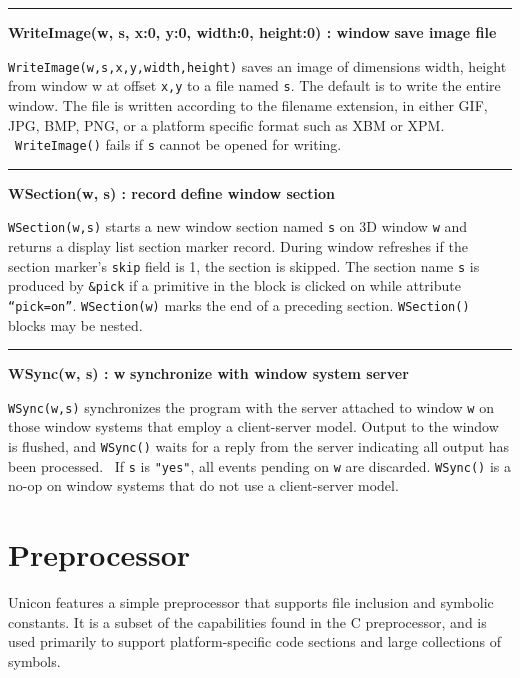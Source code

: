 \bigskip\hrule\vspace{0.1cm}
\noindent
{\bf WriteImage(w, s, x:0, y:0, width:0, height:0) : window } \hfill {\bf save image file}

\noindent
\texttt{WriteImage(w,s,x,y,width,height)} saves an image of dimensions
width, height from window w at offset \texttt{x,y} to a file named
\texttt{s}. The default is to write the entire window. The file
is written according to the filename extension, in either GIF, JPG,
BMP, PNG, or a platform specific format such as XBM or XPM.
\ \texttt{WriteImage()} fails if \texttt{s} cannot be opened for
writing.

\bigskip\hrule\vspace{0.1cm}
\noindent
{\bf WSection(w, s) : record} \hfill {\bf define window section}

\noindent
\texttt{WSection(w,s)} starts a new window section named \texttt{s} on
3D window \texttt{w} and returns a display list section marker record.
During window refreshes if the section marker's
\texttt{skip} field is 1, the section is skipped. The section name
\texttt{s} is produced by \texttt{\&pick} if a primitive in the block
is clicked on while attribute
\texttt{{\textquotedblleft}pick=on{\textquotedblright}}.
\texttt{WSection(w)} marks the end of a preceding section.
\texttt{WSection()} blocks may be nested.

\bigskip\hrule\vspace{0.1cm}
\noindent
{\bf WSync(w, s) : w} \hfill {\bf synchronize with window system server}

\noindent
\texttt{WSync(w,s)} synchronizes the program with the server attached to
window \texttt{w} on those window systems that employ a client-server
model. Output to the window is flushed, and \texttt{WSync()} waits
for a reply from the server indicating all output has been processed.
\ If \texttt{s} is \texttt{"yes"}, all
events pending on \texttt{w} are discarded. \texttt{WSync()} is a no-op
on window systems that do not use a client-server model.

\section{Preprocessor}

Unicon features a simple preprocessor that supports file
inclusion and symbolic constants. It is a subset of the capabilities found in
the C preprocessor, and is used primarily to support platform-specific code
sections and large collections of symbols.

